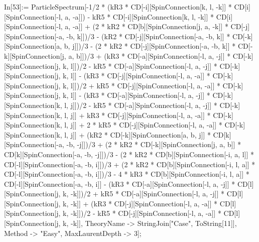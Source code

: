 In[53]:= ParticleSpectrum[-1/2 * (kR3 * CD[-i][SpinConnection[k, l, -k]] * CD[i][SpinConnection[-l, a, -a]]) - kR5 * CD[-i][SpinConnection[k, l, -k]] * CD[i][SpinConnection[-l, a, -a]] + (2 * kR2 * CD[b][SpinConnection[j, a, -k]] * CD[-j][SpinConnection[-a, -b, k]])/3 - (kR2 * CD[-j][SpinConnection[-a, -b, k]] * CD[-k][SpinConnection[a, b, j]])/3 - (2 * kR2 * CD[-j][SpinConnection[-a, -b, k]] * CD[-k][SpinConnection[j, a, b]])/3 + (kR3 * CD[-a][SpinConnection[-l, a, -j]] * CD[-k][SpinConnection[j, k, l]])/2 - kR5 * CD[-a][SpinConnection[-l, a, -j]] * CD[-k][SpinConnection[j, k, l]] - (kR3 * CD[-j][SpinConnection[-l, a, -a]] * CD[-k][SpinConnection[j, k, l]])/2 + kR5 * CD[-j][SpinConnection[-l, a, -a]] * CD[-k][SpinConnection[j, k, l]] - (kR3 * CD[-a][SpinConnection[-l, a, -j]] * CD[-k][SpinConnection[k, l, j]])/2 - kR5 * CD[-a][SpinConnection[-l, a, -j]] * CD[-k][SpinConnection[k, l, j]] + kR3 * CD[-j][SpinConnection[-l, a, -a]] * CD[-k][SpinConnection[k, l, j]] + 2 * kR5 * CD[-j][SpinConnection[-l, a, -a]] * CD[-k][SpinConnection[k, l, j]] + (kR2 * CD[-k][SpinConnection[a, b, j]] * CD[k][SpinConnection[-a, -b, -j]])/3 + (2 * kR2 * CD[-k][SpinConnection[j, a, b]] * CD[k][SpinConnection[-a, -b, -j]])/3 - (2 * kR2 * CD[b][SpinConnection[-i, a, l]] * CD[-l][SpinConnection[-a, -b, i]])/3 + (2 * kR2 * CD[b][SpinConnection[-i, l, a]] * CD[-l][SpinConnection[-a, -b, i]])/3 - 4 * kR3 * CD[b][SpinConnection[-i, l, a]] * CD[-l][SpinConnection[-a, -b, i]] - (kR3 * CD[-a][SpinConnection[-l, a, -j]] * CD[l][SpinConnection[j, k, -k]])/2 + kR5 * CD[-a][SpinConnection[-l, a, -j]] * CD[l][SpinConnection[j, k, -k]] + (kR3 * CD[-j][SpinConnection[-l, a, -a]] * CD[l][SpinConnection[j, k, -k]])/2 - kR5 * CD[-j][SpinConnection[-l, a, -a]] * CD[l][SpinConnection[j, k, -k]], TheoryName -> StringJoin["Case", ToString[11]], Method -> "Easy", MaxLaurentDepth -> 3]; 